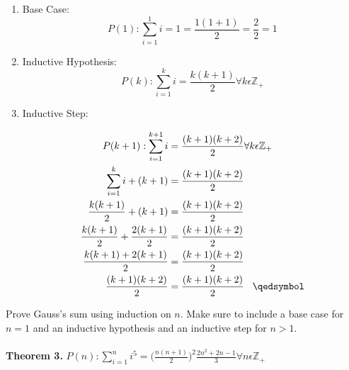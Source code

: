 \documentclass[12pt]{article}
\begin{document}
\begin{enumerate}
\item Base Case:\\
\[P(1):\sum\limits_{i = 1}^{1} i = 1  = \frac{1(1+1)}{2} = \frac{2}{2} = 1\]
\item Inductive Hypothesis:
\[P(k):\sum\limits_{i = 1}^{k} i = \frac{k(k + 1)}{2} \forall k \epsilon \mathbb{Z}_+\]
\item Inductive Step:

\begin{align*}
P(k+1):\sum\limits_{i = 1}^{k+1} i &= \frac{(k + 1)(k+2)}{2} \forall k \epsilon \mathbb{Z}_+\\
\sum\limits_{i = 1}^{k} i + (k + 1)&= \frac{(k + 1)(k+2)}{2}\\
\frac{k(k+1)}{2} + (k+1)&= \frac{(k + 1)(k+2)}{2}\\
\frac{k(k+1)}{2} + \frac{2(k+1)}{2}&= \frac{(k + 1)(k+2)}{2}\\
\frac{k(k+1)+ 2(k+1)}{2}&= \frac{(k + 1)(k+2)}{2}\\
\frac{(k + 1)(k+2)}{2}&= \frac{(k + 1)(k+2)}{2} \hspace{0.3cm}\qedsymbol
\end{align*}
\end{enumerate}
\noindent Prove Gauss’s sum using induction on \begin{math}n\end{math}. Make sure to include a base case for \begin{math} n = 1\end{math} and an inductive hypothesis and an inductive step for \begin{math}n > 1\end{math}.\\\\
\noindent \textbf{Theorem 3.}
\begin{math}P(n):\sum\limits_{i = 1}^{n} i^5 = \big(\frac{n(n + 1)}{2}\big)^2\frac{2n^2+2n-1}{3} \forall n \epsilon \mathbb{Z}_+  \end{math}
\end{document}
